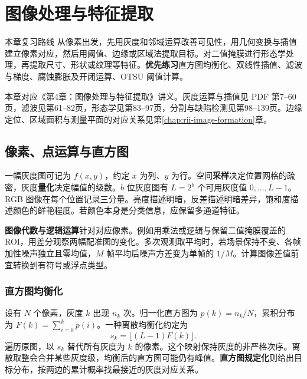 \chapter{图像处理与特征提取}
\label{chap:rii-image-processing}

\begin{focusbox}{本章复习路线}
从像素出发，先用灰度和邻域运算改善可见性，用几何变换与插值建立像素对应，然后用阈值、边缘或区域法提取目标。对二值掩膜进行形态学处理，再提取尺寸、形状或纹理等特征。\textbf{优先练习}直方图均衡化、双线性插值、滤波与梯度、腐蚀膨胀及开闭运算、OTSU 阈值计算。
\end{focusbox}

本章对应《第4章：图像处理与特征提取》讲义。灰度运算与插值见 PDF 第7--60页，滤波见第61--82页，形态学见第83--97页，分割与缺陷检测见第98--139页。边缘定位、区域面积与测量平面的对应关系见第\ref{chap:rii-image-formation}章。

\section{像素、点运算与直方图}

一幅灰度图可记为 $f(x,y)$，约定 $x$ 为列、$y$ 为行。空间\textbf{采样}决定位置网格的疏密，灰度\textbf{量化}决定幅值的级数。$b$ 位灰度图有 $L=2^b$ 个可用灰度值 $0,\ldots,L-1$。RGB 图像在每个位置记录三分量。亮度描述明暗，反差描述明暗差异，饱和度描述颜色的鲜艳程度。若颜色本身是分类信息，应保留多通道特征。


\textbf{图像代数与逻辑运算}针对对应像素。例如用乘法或逻辑与保留二值掩膜覆盖的 ROI，用差分观察两幅配准图的变化。多次观测取平均时，若场景保持不变、各帧加性噪声独立且零均值，$M$ 帧平均后噪声方差变为单帧的 $1/M$。计算图像差值前宜转换到有符号或浮点类型。

\subsection{直方图均衡化}

设有 $N$ 个像素，灰度 $k$ 出现 $n_k$ 次。归一化直方图为 $p(k)=n_k/N$，累积分布为 $F(k)=\sum_{i=0}^{k}p(i)$。一种离散均衡化约定为
\[
s_k=\bigl\lfloor (L-1)F(k)\bigr\rfloor .
\]
遍历原图，以 $s_k$ 替代所有灰度为 $k$ 的像素。这个映射保持灰度的非严格次序。离散取整会合并某些灰度级，均衡后的直方图可能仍有峰值。\textbf{直方图规定化}则给出目标分布，按两边的累计概率找最接近的灰度对应关系。

